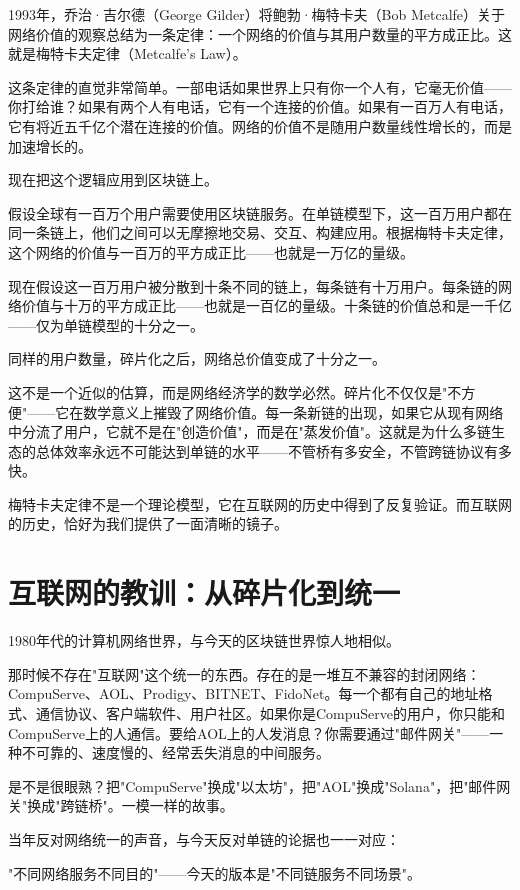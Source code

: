 \documentclass[a4paper,12pt,openany]{ctexbook}
\begin{document}
1993年，乔治·吉尔德（George Gilder）将鲍勃·梅特卡夫（Bob Metcalfe）关于网络价值的观察总结为一条定律：一个网络的价值与其用户数量的平方成正比。这就是梅特卡夫定律（Metcalfe's Law）。

这条定律的直觉非常简单。一部电话如果世界上只有你一个人有，它毫无价值——你打给谁？如果有两个人有电话，它有一个连接的价值。如果有一百万人有电话，它有将近五千亿个潜在连接的价值。网络的价值不是随用户数量线性增长的，而是加速增长的。

现在把这个逻辑应用到区块链上。

假设全球有一百万个用户需要使用区块链服务。在单链模型下，这一百万用户都在同一条链上，他们之间可以无摩擦地交易、交互、构建应用。根据梅特卡夫定律，这个网络的价值与一百万的平方成正比——也就是一万亿的量级。

现在假设这一百万用户被分散到十条不同的链上，每条链有十万用户。每条链的网络价值与十万的平方成正比——也就是一百亿的量级。十条链的价值总和是一千亿——仅为单链模型的十分之一。

同样的用户数量，碎片化之后，网络总价值变成了十分之一。

这不是一个近似的估算，而是网络经济学的数学必然。碎片化不仅仅是"不方便"——它在数学意义上摧毁了网络价值。每一条新链的出现，如果它从现有网络中分流了用户，它就不是在"创造价值"，而是在"蒸发价值"。这就是为什么多链生态的总体效率永远不可能达到单链的水平——不管桥有多安全，不管跨链协议有多快。

梅特卡夫定律不是一个理论模型，它在互联网的历史中得到了反复验证。而互联网的历史，恰好为我们提供了一面清晰的镜子。


\section*{互联网的教训：从碎片化到统一}


1980年代的计算机网络世界，与今天的区块链世界惊人地相似。

那时候不存在"互联网"这个统一的东西。存在的是一堆互不兼容的封闭网络：CompuServe、AOL、Prodigy、BITNET、FidoNet。每一个都有自己的地址格式、通信协议、客户端软件、用户社区。如果你是CompuServe的用户，你只能和CompuServe上的人通信。要给AOL上的人发消息？你需要通过"邮件网关"——一种不可靠的、速度慢的、经常丢失消息的中间服务。

是不是很眼熟？把"CompuServe"换成"以太坊"，把"AOL"换成"Solana"，把"邮件网关"换成"跨链桥"。一模一样的故事。

当年反对网络统一的声音，与今天反对单链的论据也一一对应：

"不同网络服务不同目的"——今天的版本是"不同链服务不同场景"。
\end{document}
